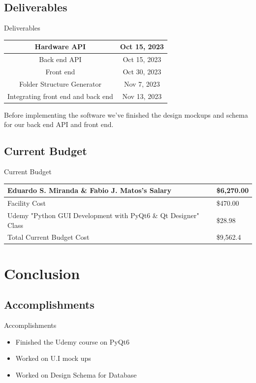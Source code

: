 \documentclass[17pt, aspectratio=169]{beamer}
\begin{document}
\subsection*{Deliverables}
\begin{frame}{Deliverables}
	\begin{center}
		\begin{tabular}{||c | c||}
			\hline
			Hardware API & Oct 15, 2023 \\
			\hline
			Back end API & Oct 15, 2023 \\
			\hline
			Front end    & Oct 30, 2023 \\
			\hline
			Folder Structure Generator & Nov 7, 2023\\
			\hline
			Integrating front end and back end & Nov 13, 2023 \\
			\hline
		\end{tabular}
	\end{center}
	Before implementing the software we've finished the design mockups and schema for our back end API and front end.
\end{frame}
\subsection*{Current Budget}
\begin{frame}{Current Budget}
	\begin{center}
		\begin{tabular}{||m{} | m{} ||}
			\hline
			Eduardo S. Miranda \& Fabio J. Matos's Salary                  & \$6,270.00 \\
			\hline
			Facility Cost                                                  & \$470.00   \\
			\hline
			Udemy "Python GUI Development with PyQt6 \& Qt Designer" Class & \$28.98    \\
			\hline
			Total Current Budget Cost                                      & \$9,562.4  \\
			\hline
		\end{tabular}
	\end{center}
\end{frame}
\section{Conclusion}
\subsection{Accomplishments}
\begin{frame}{Accomplishments}
	\begin{itemize}
		\item Finished the Udemy course on PyQt6
		\item Worked on U.I mock ups
		\item Worked on Design Schema for Database
	\end{itemize}
\end{frame}
\end{document}
